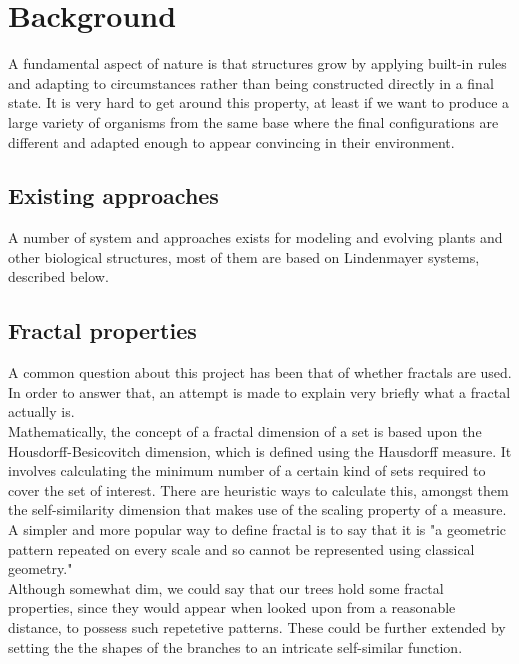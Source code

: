
\section{Background}

    A fundamental aspect of nature is that structures grow by applying built-in
    rules and adapting to circumstances rather than being constructed directly
    in a final state. It is very hard to get around this property, at least if
    we want to produce a large variety of organisms from the same base where
    the final configurations are different and adapted enough to appear
    convincing in their environment.



\subsection{Existing approaches}

    A number of system and approaches exists for modeling and evolving
    plants and other biological structures, most of them are based on
    Lindenmayer systems, described below. 



\subsection{Fractal properties}
    A common question about this project has been that of whether fractals are used.
    In order to answer that, an attempt is made to explain
    very briefly what a fractal actually is.\\
    Mathematically, the concept of a fractal dimension of a
    set is based upon the Housdorff-Besicovitch dimension,
    which is defined using the Hausdorff measure. It involves
    calculating the minimum number of a certain kind of sets
    required to cover the set of interest. There are
    heuristic ways to calculate this, amongst them the
    self-similarity dimension that makes use of the scaling
    property of a measure.\\
    A simpler and more popular way to define fractal is to
    say that it is "a geometric pattern repeated on every
    scale and so cannot be represented using classical
    geometry."\\
    Although somewhat dim, we could say that our trees hold
    some fractal properties, since they would appear when
    looked upon from a reasonable distance, to possess such
    repetetive patterns. These could be further extended by
    setting the the shapes of the branches to an intricate
    self-similar function.
 




